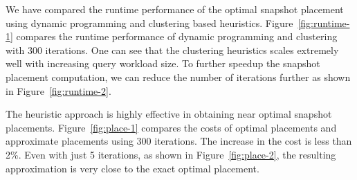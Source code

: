 We have compared the runtime performance of the optimal snapshot placement using
dynamic programming and clustering based heuristics.  Figure~\ref{fig:runtime-1}
compares the runtime performance of dynamic programming and clustering with 300
iterations.  One can see that the clustering heuristics scales extremely well
with increasing query workload size.  To further speedup the snapshot placement
computation, we can reduce the number of iterations further as shown in
Figure~\ref{fig:runtime-2}.

The heuristic approach is highly effective in obtaining near optimal snapshot
placements. Figure~\ref{fig:place-1} compares the costs of optimal placements and
approximate placements using 300 iterations.  The increase in the cost is less
than 2\%.  Even with just 5 iterations, as shown in Figure~\ref{fig:place-2}, the
resulting approximation is very close to the exact optimal placement.

